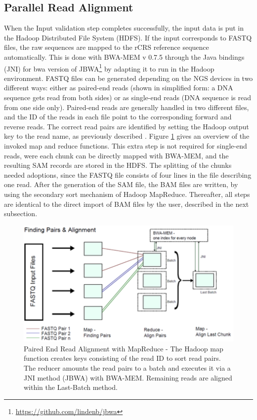 \subsection{Parallel Read Alignment}
When the Input validation step completes successfully, the input data is put in the Hadoop Distributed File System (HDFS). If the input corresponds to FASTQ files, the raw sequences are mapped to the rCRS reference sequence automatically. This is done with BWA-MEM v 0.7.5 \cite{Li2013a} through the Java bindings (JNI) for bwa version of JBWA\footnote{\url{https://github.com/lindenb/jbwa}} by adapting it to run in the Hadoop environment. FASTQ files can be generated depending on the NGS devices in two different ways: either as paired-end reads (shown in simplified form: a DNA sequence gets read from both sides) or as single-end reads (DNA sequence is read from one side only). Paired-end reads are generally handled in two different files, and the ID of the reads in each file point to the corresponding forward and reverse reads.
The correct read pairs are identified by setting the Hadoop output key to the read name, as previously described \cite{Weissensteiner2016b, Pireddu2011}. Figure \ref{fig:mapreduce} gives an overview of the invoked map and reduce functions. This extra step is not required for single-end reads, were each chunk can be directly mapped with BWA-MEM, and the resulting SAM records are stored in the HDFS. The splitting of the chunks needed adoptions, since the FASTQ file consists of four lines in the file describing one read. After the generation of the SAM file, the BAM files are written, by using the secondary sort mechanism of Hadoop MapReduce. Thereafter, all steps are identical to the direct import of BAM files by the user, described in the next subsection.
\begin{figure}[!ht]
    \centering
    \includegraphics[width=1\textwidth]{images/mapreduce.png}
    \caption[Paired End Read Alignment with MapReduce]{Paired End Read Alignment with MapReduce - The Hadoop map function creates keys consisting of the read ID to sort read pairs. The reducer amounts the read pairs to a batch and executes it via a JNI method (JBWA) with BWA-MEM. Remaining reads are aligned within the Last-Batch method.  }
    \label{fig:mapreduce}
\end{figure}
